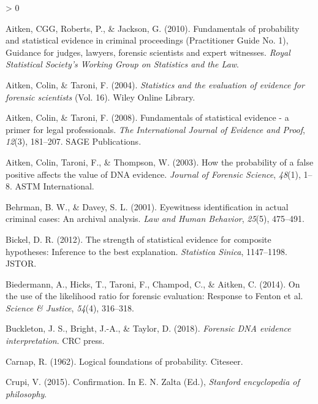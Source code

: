 \documentclass[
  10pt,
  dvipsnames,enabledeprecatedfontcommands]{scrartcl}
\newlength{\cslhangindent}
\newenvironment{CSLReferences}[2] %
 {%
  \setlength{\parindent}{0pt}
  \ifodd #1 \everypar{\setlength{\hangindent}{\cslhangindent}}\ignorespaces\fi
  \ifnum #2 > 0
  \setlength{\parskip}{#2\baselineskip}
  \fi
 }%
 {}
\begin{document}
\hypertarget{refs}{}
\begin{CSLReferences}{1}{0}
\leavevmode\hypertarget{ref-aitken2010fundamentals}{}%
Aitken, CGG, Roberts, P., \& Jackson, G. (2010). Fundamentals of
probability and statistical evidence in criminal proceedings
({P}ractitioner {G}uide {N}o. 1), {G}uidance for judges, lawyers,
forensic scientists and expert witnesses. \emph{Royal Statistical
Society's Working Group on Statistics and the Law}.

\leavevmode\hypertarget{ref-aitken2004statistics}{}%
Aitken, Colin, \& Taroni, F. (2004). \emph{Statistics and the evaluation
of evidence for forensic scientists} (Vol. 16). Wiley Online Library.

\leavevmode\hypertarget{ref-aitken2008fundamentals}{}%
Aitken, Colin, \& Taroni, F. (2008). Fundamentals of statistical
evidence - a primer for legal professionals. \emph{The International
Journal of Evidence and Proof}, \emph{12}(3), 181--207. SAGE
Publications.

\leavevmode\hypertarget{ref-aitken2003probability}{}%
Aitken, Colin, Taroni, F., \& Thompson, W. (2003). How the probability
of a false positive affects the value of DNA evidence. \emph{Journal of
Forensic Science}, \emph{48}(1), 1--8. ASTM International.

\leavevmode\hypertarget{ref-behrman2001EyewitnessIdentificationActual}{}%
Behrman, B. W., \& Davey, S. L. (2001). Eyewitness identification in
actual criminal cases: {An} archival analysis. \emph{Law and Human
Behavior}, \emph{25}(5), 475--491.

\leavevmode\hypertarget{ref-bickel2012strength}{}%
Bickel, D. R. (2012). The strength of statistical evidence for composite
hypotheses: Inference to the best explanation. \emph{Statistica Sinica},
1147--1198. JSTOR.

\leavevmode\hypertarget{ref-biedermann2014UseLikelihoodRatio}{}%
Biedermann, A., Hicks, T., Taroni, F., Champod, C., \& Aitken, C.
(2014). On the use of the likelihood ratio for forensic evaluation:
{Response} to {Fenton} et al. \emph{Science \& Justice}, \emph{54}(4),
316--318.

\leavevmode\hypertarget{ref-buckleton2018forensic}{}%
Buckleton, J. S., Bright, J.-A., \& Taylor, D. (2018). \emph{Forensic
DNA evidence interpretation}. CRC press.

\leavevmode\hypertarget{ref-carnap1962logical}{}%
Carnap, R. (1962). Logical foundations of probability. Citeseer.

\leavevmode\hypertarget{ref-crupi2015confirmation}{}%
Crupi, V. (2015). Confirmation. In E. N. Zalta (Ed.), \emph{Stanford
encyclopedia of philosophy}.


\end{CSLReferences}
\end{document}

